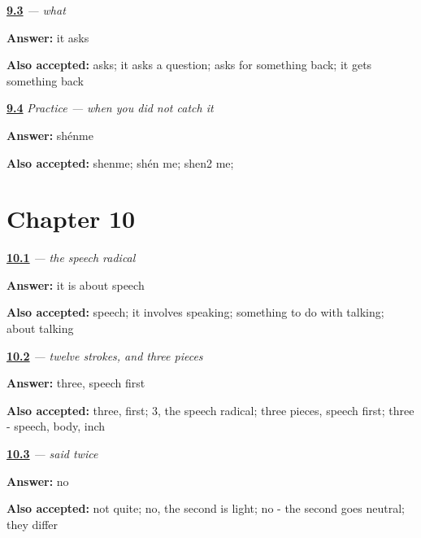 \noindent\begin{minipage}[t]{\linewidth}
\raggedright
\hyperlink{review-ZH-C09-shenme-job}{\textbf{9.3}} \emph{ — what}\par
\small \textbf{Answer:} it asks\par
\footnotesize \textbf{Also accepted:} asks; it asks a question; asks for something back; it gets something back
\end{minipage}\par\medskip

\noindent\begin{minipage}[t]{\linewidth}
\raggedright
\hyperlink{review-ZH-C09-practice-repair}{\textbf{9.4}} \emph{Practice — when you did not catch it}\par
\small \textbf{Answer:} shénme\par
\footnotesize \textbf{Also accepted:} shenme; shén me; shen2 me; 
\end{minipage}\par\medskip

\section*{Chapter 10}

\noindent\begin{minipage}[t]{\linewidth}
\raggedright
\hyperlink{review-ZH-W10-yan-meaning}{\textbf{10.1}} \emph{ — the speech radical}\par
\small \textbf{Answer:} it is about speech\par
\footnotesize \textbf{Also accepted:} speech; it involves speaking; something to do with talking; about talking
\end{minipage}\par\medskip

\noindent\begin{minipage}[t]{\linewidth}
\raggedright
\hyperlink{review-ZH-W10-xie-pieces}{\textbf{10.2}} \emph{ — twelve strokes, and three pieces}\par
\small \textbf{Answer:} three, speech first\par
\footnotesize \textbf{Also accepted:} three,  first; 3, the speech radical; three pieces, speech first; three - speech, body, inch
\end{minipage}\par\medskip

\noindent\begin{minipage}[t]{\linewidth}
\raggedright
\hyperlink{review-ZH-C10-xiexie-same}{\textbf{10.3}} \emph{ — said twice}\par
\small \textbf{Answer:} no\par
\footnotesize \textbf{Also accepted:} not quite; no, the second is light; no - the second goes neutral; they differ
\end{minipage}\par\medskip

